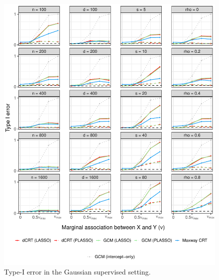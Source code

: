 \documentclass[aos]{imsart}
\theoremstyle{plain}
\theoremstyle{remark}
\begin{document}
\begin{figure}[!ht]
	\centering
	\includegraphics[width = \textwidth]{figures/gaussian_supervised_setting_null.pdf}
	\caption{Type-I error in the Gaussian supervised setting.}
	\label{fig:gaussian_supervised_null}
\end{figure}
\end{document}
